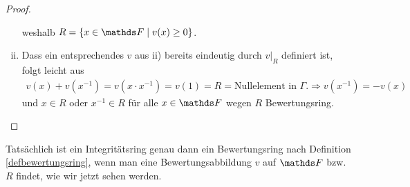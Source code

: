 \documentclass[ngerman,fontsize=11pt, paper=a4, parskip=half, titlepage=true, toc=bib]{scrartcl}
\begin{document}
\begin{Satz}
\begin{proof}
\begin{enumerate}[i)]
      weshalb $R=\{x\in\F\mid v(x)\geq 0\}$.
    \item Dass ein entsprechendes $v$ aus ii) bereits eindeutig
      durch $v|_{R}$ definiert ist, folgt leicht aus
      \begin{gather*}
        v(x)+v(x^{-1}) = v(x\cdot x^{-1}) = v(1) = R  =
        \text{Nullelement in }\Gamma.
        \Longrightarrow v(x^{-1})=-v(x)
      \end{gather*}
      und $x\in R$ oder $x^{-1}\in R$ für alle $x\in\F$ wegen $R$
      Bewertungsring.
    \end{enumerate}
  \end{proof}
\end{Satz}


Tatsächlich ist ein Integritätsring genau dann
ein Bewertungsring nach Definition \ref{defbewertungsring},
wenn man eine Bewertungsabbildung $v$ auf $\F$ bzw. $R$ findet,
wie wir jetzt sehen werden.
\end{document}
